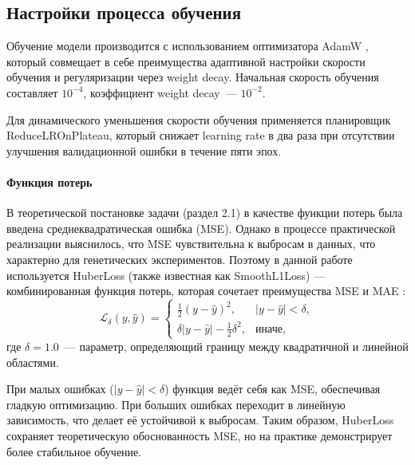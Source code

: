 	

\subsection{Настройки процесса обучения}
\label{ch2:training_settings}

Обучение модели производится с использованием оптимизатора AdamW 
\cite{Loshchilov2019}, который совмещает в себе преимущества адаптивной 
настройки скорости обучения и регуляризации через weight decay. 
Начальная скорость обучения составляет $10^{-4}$, коэффициент 
weight decay~--- $10^{-2}$.

Для динамического уменьшения скорости обучения применяется 
планировщик ReduceLROnPlateau, который снижает learning rate в два 
раза при отсутствии улучшения валидационной ошибки в течение пяти 
эпох.

\paragraph{Функция потерь}

В теоретической постановке задачи (раздел 2.1) в качестве функции 
потерь была введена среднеквадратическая ошибка (MSE). Однако в 
процессе практической реализации выяснилось, что MSE чувствительна 
к выбросам в данных, что характерно для генетических экспериментов. 
Поэтому в данной работе используется HuberLoss (также известная как 
SmoothL1Loss) — комбинированная функция потерь, которая сочетает 
преимущества MSE и MAE \cite{Huber1964}:
\[
\mathcal{L}_{\delta}(y, \hat{y}) = 
\begin{cases}
	\frac{1}{2}(y - \hat{y})^2, & |y - \hat{y}| < \delta, \\
	\delta|y - \hat{y}| - \frac{1}{2}\delta^2, & \text{иначе},
\end{cases}
\]
где $\delta = 1.0$~--- параметр, определяющий границу между 
квадратичной и линейной областями.

При малых ошибках ($|y - \hat{y}| < \delta$) функция ведёт себя как 
MSE, обеспечивая гладкую оптимизацию. При больших ошибках переходит 
в линейную зависимость, что делает её устойчивой к выбросам. Таким 
образом, HuberLoss сохраняет теоретическую обоснованность MSE, но 
на практике демонстрирует более стабильное обучение.

